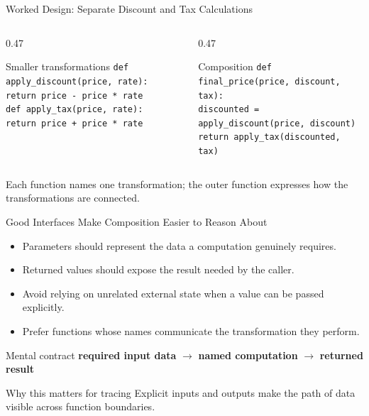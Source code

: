 \documentclass[aspectratio=169,10pt]{beamer}
\begin{document}
\begin{frame}{Worked Design: Separate Discount and Tax Calculations}
  \begin{columns}[T,onlytextwidth]
    \begin{column}{0.47\textwidth}
      \begin{block}{Smaller transformations}
        \texttt{def apply\_discount(price, rate):}\\
        \hspace*{0.18in}\texttt{return price - price * rate}\\[0.07in]
        \texttt{def apply\_tax(price, rate):}\\
        \hspace*{0.18in}\texttt{return price + price * rate}
      \end{block}
    \end{column}

    \begin{column}{0.47\textwidth}
      \begin{block}{Composition}
        \texttt{def final\_price(price, discount, tax):}\\
        \hspace*{0.18in}\texttt{discounted = apply\_discount(price, discount)}\\
        \hspace*{0.18in}\texttt{return apply\_tax(discounted, tax)}
      \end{block}
    \end{column}
  \end{columns}

  \begin{keyidea}
    Each function names one transformation; the outer function expresses how the transformations are connected.
  \end{keyidea}
\end{frame}

\begin{frame}{Good Interfaces Make Composition Easier to Reason About}
  \begin{itemize}
    \item Parameters should represent the data a computation genuinely requires.
    \item Returned values should expose the result needed by the caller.
    \item Avoid relying on unrelated external state when a value can be passed explicitly.
    \item Prefer functions whose names communicate the transformation they perform.
  \end{itemize}

  \begin{block}{Mental contract}
    \centering
    \textbf{required input data} $\rightarrow$ \textbf{named computation} $\rightarrow$ \textbf{returned result}
  \end{block}

  \begin{alertblock}{Why this matters for tracing}
    Explicit inputs and outputs make the path of data visible across function boundaries.
  \end{alertblock}
\end{frame}
\end{document}

